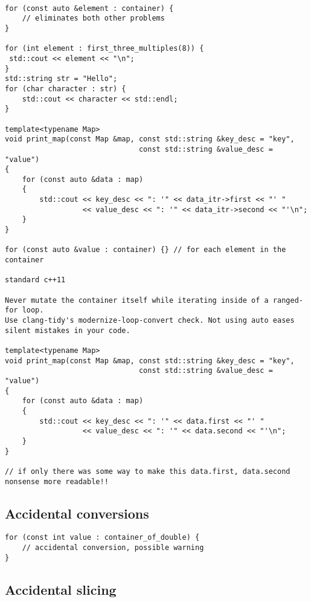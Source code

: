 \documentclass[openany]{report}
\begin{document}
\begin{verbatim}

for (const auto &element : container) {
    // eliminates both other problems
}

for (int element : first_three_multiples(8)) {
 std::cout << element << "\n";
}
std::string str = "Hello";
for (char character : str) {
    std::cout << character << std::endl;
}

template<typename Map>
void print_map(const Map &map, const std::string &key_desc = "key",
                               const std::string &value_desc = "value")
{
    for (const auto &data : map)
    {
        std::cout << key_desc << ": '" << data_itr->first << "' "
                  << value_desc << ": '" << data_itr->second << "'\n";
    }
}

for (const auto &value : container) {} // for each element in the container

standard c++11

Never mutate the container itself while iterating inside of a ranged-for loop. 
Use clang-tidy's modernize-loop-convert check. Not using auto eases silent mistakes in your code.

template<typename Map>
void print_map(const Map &map, const std::string &key_desc = "key",
                               const std::string &value_desc = "value")
{
    for (const auto &data : map)
    {
        std::cout << key_desc << ": '" << data.first << "' "
                  << value_desc << ": '" << data.second << "'\n";
    }
}

// if only there was some way to make this data.first, data.second nonsense more readable!!
\end{verbatim}

\subsection{Accidental conversions}

\begin{verbatim}
for (const int value : container_of_double) {
    // accidental conversion, possible warning
}
\end{verbatim}

\subsection{Accidental slicing}
\end{document}
